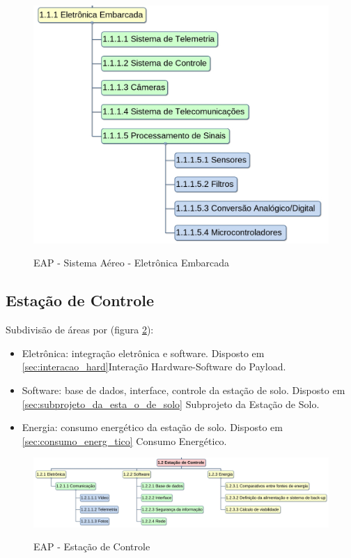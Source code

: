 	\begin{figure}[H]
		\centering
		\caption{EAP - Sistema Aéreo - Eletrônica Embarcada}
		\includegraphics[width=\textwidth]{figuras/eap-sistema-aereo-1}
		\label{img:eap-sa1}
	\end{figure}

	\subsection{Estação de Controle}

	Subdivisão de áreas por (figura \ref{img:eap-vg2}):

	\begin{itemize}
	\item Eletrônica: integração eletrônica e software. Disposto em \ref{sec:interacao_hard}Interação Hardware-Software do Payload.
	\item Software: base de dados, interface, controle da estação de solo. Disposto em \ref{sec:subprojeto_da_esta_o_de_solo} Subprojeto da Estação de Solo.
	\item Energia: consumo energético da estação de solo. Disposto em \ref{sec:consumo_energ_tico} Consumo Energético.
	\end{itemize}

	\begin{figure}[H]
		\centering
		\caption{EAP - Estação de Controle}
		\includegraphics[width=\textwidth]{figuras/eap-estacao-de-controle}
		\label{img:eap-vg2}
	\end{figure}

